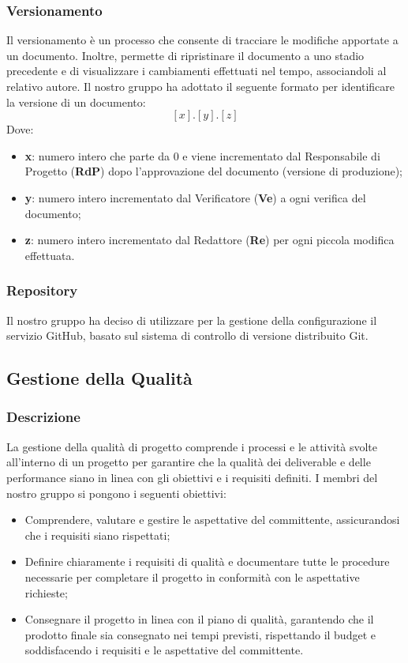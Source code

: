 \subsubsection{Versionamento}
Il versionamento è un processo che consente di tracciare le modifiche apportate a un documento. 
Inoltre, permette di ripristinare il documento a uno stadio precedente e di visualizzare i cambiamenti effettuati nel tempo, 
associandoli al relativo autore.
Il nostro gruppo ha adottato il seguente formato per identificare la versione di un documento:  
\[
[x].[y].[z]
\]
Dove:
\begin{itemize}
    \item \textbf{x}: numero intero che parte da 0 e viene incrementato dal Responsabile di Progetto (\textbf{RdP}) dopo l'approvazione del documento (versione di produzione);
    \item \textbf{y}: numero intero incrementato dal Verificatore (\textbf{Ve}) a ogni verifica del documento;
    \item \textbf{z}: numero intero incrementato dal Redattore (\textbf{Re}) per ogni piccola modifica effettuata.
\end{itemize}

\subsubsection{Repository}
Il nostro gruppo ha deciso di utilizzare per la gestione della configurazione il servizio GitHub, 
basato sul sistema di controllo di versione distribuito Git.








\subsection{Gestione della Qualità}
\subsubsection{Descrizione}
La gestione della qualità di progetto comprende i processi e le attività svolte all’interno di un progetto per garantire 
che la qualità dei deliverable e delle performance siano in linea con gli obiettivi e i requisiti definiti.
I membri del nostro gruppo si pongono i seguenti obiettivi:
\begin{itemize}
    \item Comprendere, valutare e gestire le aspettative del committente, assicurandosi che i requisiti siano rispettati;
    \item Definire chiaramente i requisiti di qualità e documentare tutte le procedure necessarie per completare 
            il progetto in conformità con le aspettative richieste;
    \item Consegnare il progetto in linea con il piano di qualità, garantendo che il prodotto finale sia consegnato 
            nei tempi previsti, rispettando il budget e soddisfacendo i requisiti e le aspettative del committente.
\end{itemize}

